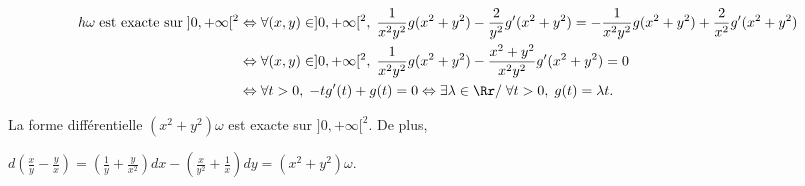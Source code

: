 {\begin{enumerate}
{\begin{align*}\ensuremath
h\omega\;\text{est exacte sur}\;]0,+\infty[^2&\Leftrightarrow\forall(x,y)\in]0,+\infty[^2,\; \frac{1}{x^2y^2}g(x^2+y^2)- \frac{2}{y^2}g'(x^2+y^2)=- \frac{1}{x^2y^2}g(x^2+y^2)+ \frac{2}{x^2}g'(x^2+y^2)\\
 &\Leftrightarrow\forall(x,y)\in]0,+\infty[^2,\; \frac{1}{x^2y^2}g(x^2+y^2)- \frac{x^2+y^2}{x^2y^2}g'(x^2+y^2)=0\\
 &\Leftrightarrow\forall t>0,\;-tg'(t)+g(t)=0\Leftrightarrow\exists \lambda\in\Rr/\;\forall t>0,\;g(t)=\lambda t.
\end{align*}

La forme différentielle $(x^2+y^2)\omega$ est exacte sur $]0,+\infty[^2$. De plus, 

\begin{center}
$d\left( \frac{x}{y}- \frac{y}{x}\right)=\left( \frac{1}{y}+ \frac{y}{x^2}\right)dx-\left( \frac{x}{y^2}+ \frac{1}{x}\right)dy=(x^2+y^2)\omega$.
\end{center}}
\end{enumerate}
}